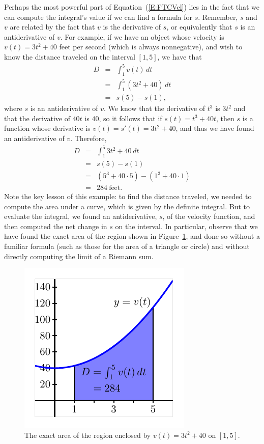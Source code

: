 Perhaps the most powerful part of Equation~(\ref{E:FTCVel}) lies in the fact that we can compute the integral's value if we can find a formula for $s$.  Remember, $s$ and $v$ are related by the fact that $v$ is the derivative of $s$, or equivalently that $s$ is an antiderivative of $v$.  For example, if we have an object whose velocity is $v(t) = 3t^2 + 40$ feet per second (which is always nonnegative), and wish to know the distance traveled on the interval $[1,5]$, we have that
\begin{eqnarray*}
D & = & \int_1^5 v(t) \,dt \\
	& = & \int_1^5 (3t^2 + 40) \, dt \\
	& = & s(5) - s(1),
\end{eqnarray*}
where $s$ is an antiderivative of $v$.  We know that the derivative of $t^3$ is $3t^2$ and that the derivative of $40t$ is $40$, so it follows that if $s(t) = t^3 + 40t$, then $s$ is a function whose derivative is $v(t) = s'(t) = 3t^2 + 40$, and thus we have found an antiderivative of $v$.  Therefore,
\begin{eqnarray*}
D & = & \int_1^5 3t^2 + 40 \, dt \\
	& = & s(5) - s(1) \\
	& = & (5^3 + 40 \cdot 5) - (1^3 + 40\cdot 1) \\
	& = & 284 \ \mbox{feet}.
\end{eqnarray*} 
Note the key lesson of this example:  to find the distance traveled, we needed to compute the area under a curve, which is given by the definite integral.  But to evaluate the integral, we found an antiderivative, $s$, of the velocity function, and then computed the net change in $s$ on the interval.  In particular, observe that we have found the exact area of the region shown in Figure~\ref{F:4.4.FTCVel2}, and done so without a familiar formula (such as those for the area of a triangle or circle) and without directly computing the limit of a Riemann sum.

\begin{figure}[h]
\begin{center}
\includegraphics{figures/4_4_FTCVel2}
\caption{The exact area of the region enclosed by $v(t) = 3t^2 + 40$ on $[1,5]$.} \label{F:4.4.FTCVel2}
\end{center}
\end{figure}

